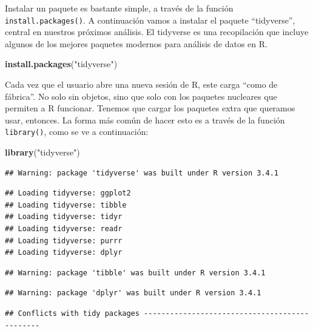 \documentclass[]{book}
\newenvironment{Shaded}{\begin{snugshade}}{\end{snugshade}}
\newcommand{\KeywordTok}[1]{\textcolor[rgb]{0.13,0.29,0.53}{\textbf{#1}}}
\newcommand{\StringTok}[1]{\textcolor[rgb]{0.31,0.60,0.02}{#1}}
\newcommand{\NormalTok}[1]{#1}
\begin{document}
Instalar un paquete es bastante simple, a través de la función
\texttt{install.packages()}. A continuación vamos a instalar el paquete
``tidyverse'', central en nuestros próximos análisis. El tidyverse es
una recopilación que incluye algunos de los mejores paquetes modernos
para análisis de datos en R.

\begin{Shaded}
\begin{Highlighting}[]
\KeywordTok{install.packages}\NormalTok{(}\StringTok{"tidyverse"}\NormalTok{)}
\end{Highlighting}
\end{Shaded}

Cada vez que el usuario abre una nueva sesión de R, este carga ``como de
fábrica''. No solo sin objetos, sino que solo con los paquetes nucleares
que permiten a R funcionar. Tenemos que cargar los paquetes extra que
queramos usar, entonces. La forma más común de hacer esto es a través de
la función \texttt{library()}, como se ve a continuación:

\begin{Shaded}
\begin{Highlighting}[]
\KeywordTok{library}\NormalTok{(}\StringTok{"tidyverse"}\NormalTok{)}
\end{Highlighting}
\end{Shaded}

\begin{verbatim}
## Warning: package 'tidyverse' was built under R version 3.4.1
\end{verbatim}

\begin{verbatim}
## Loading tidyverse: ggplot2
## Loading tidyverse: tibble
## Loading tidyverse: tidyr
## Loading tidyverse: readr
## Loading tidyverse: purrr
## Loading tidyverse: dplyr
\end{verbatim}

\begin{verbatim}
## Warning: package 'tibble' was built under R version 3.4.1
\end{verbatim}

\begin{verbatim}
## Warning: package 'dplyr' was built under R version 3.4.1
\end{verbatim}

\begin{verbatim}
## Conflicts with tidy packages ----------------------------------------------
\end{verbatim}
\end{document}
